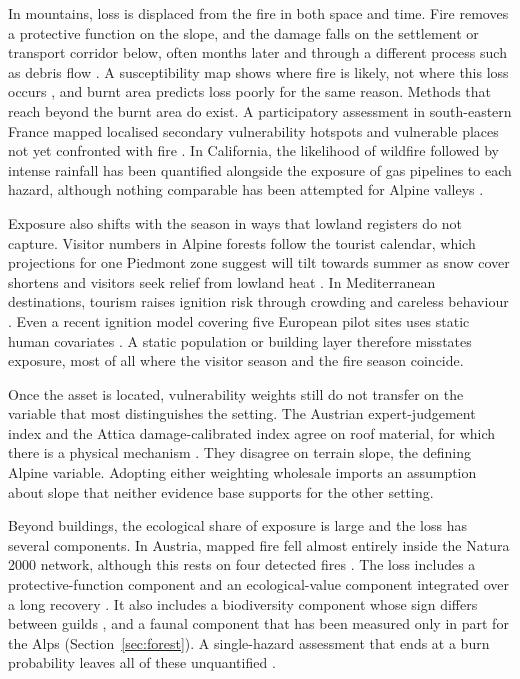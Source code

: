 \documentclass[11pt,a4paper]{article}
\begin{document}
In mountains, loss is displaced from the fire in both space and time. Fire removes a protective function on the slope, and the damage falls on the settlement or transport corridor below, often months later and through a different process such as debris flow \citep{tiranti_wildfires_2021, laporta_postwildfire_2025}. A susceptibility map shows where fire is likely, not where this loss occurs \citep{trucchia_defining_2022}, and burnt area predicts loss poorly for the same reason. Methods that reach beyond the burnt area do exist. A participatory assessment in south-eastern France mapped localised secondary vulnerability hotspots and vulnerable places not yet confronted with fire \citep{riviere_mapping_2023}. In California, the likelihood of wildfire followed by intense rainfall has been quantified alongside the exposure of gas pipelines to each hazard, although nothing comparable has been attempted for Alpine valleys \citep{moftakhari_increasing_2019}.

Exposure also shifts with the season in ways that lowland registers do not capture. Visitor numbers in Alpine forests follow the tourist calendar, which projections for one Piedmont zone suggest will tilt towards summer as snow cover shortens and visitors seek relief from lowland heat \citep{pede_mountain_2022}. In Mediterranean destinations, tourism raises ignition risk through crowding and careless behaviour \citep{abrham_wildfires_2024}. Even a recent ignition model covering five European pilot sites uses static human covariates \citep{gelabert_assessing_2025}. A static population or building layer therefore misstates exposure, most of all where the visitor season and the fire season coincide.

Once the asset is located, vulnerability weights still do not transfer on the variable that most distinguishes the setting. The Austrian expert-judgement index and the Attica damage-calibrated index agree on roof material, for which there is a physical mechanism \citep{papathomakohle_towards_2025, papathomakohle_wildfire_2022, naser_vulnerability_2025}. They disagree on terrain slope, the defining Alpine variable. Adopting either weighting wholesale imports an assumption about slope that neither evidence base supports for the other setting.

Beyond buildings, the ecological share of exposure is large and the loss has several components. In Austria, mapped fire fell almost entirely inside the Natura 2000 network, although this rests on four detected fires \citep{jrc_advance_2026}. The loss includes a protective-function component \citep{moos_climate_2021} and an ecological-value component integrated over a long recovery \citep{arrogantefunes_mapping_2024}. It also includes a biodiversity component whose sign differs between guilds \citep{rey_effects_2019, degiuli_arrested_2024}, and a faunal component that has been measured only in part for the Alps (Section~\ref{sec:forest}). A single-hazard assessment that ends at a burn probability leaves all of these unquantified \citep{trucchia_defining_2022}.
\end{document}
